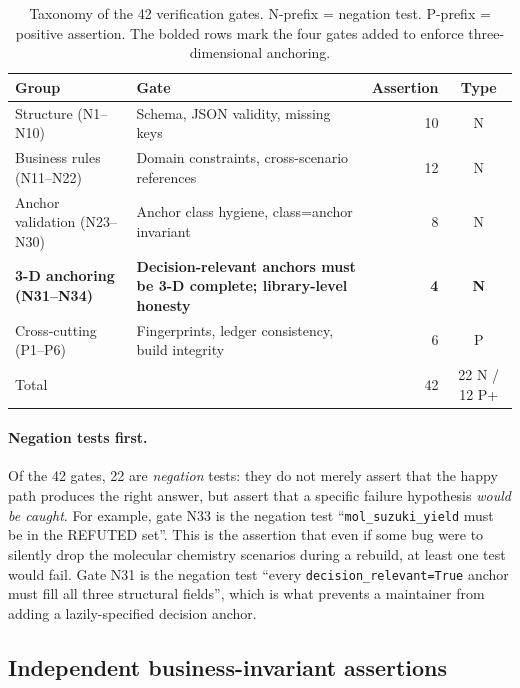 \documentclass[review,3p]{elsarticle}
\begin{document}
\begin{table}[h]
    \centering
    \caption{Taxonomy of the 42 verification gates. N-prefix = negation test. P-prefix = positive assertion. The bolded rows mark the four gates added to enforce three-dimensional anchoring.}
    \label{tab:gates}
    \begin{tabular}{l l r c}
        \toprule
        Group & Gate & Assertion & Type \\
        \midrule
        Structure (N1--N10) & Schema, JSON validity, missing keys & 10 & N \\
        Business rules (N11--N22) & Domain constraints, cross-scenario references & 12 & N \\
        Anchor validation (N23--N30) & Anchor class hygiene, class=anchor invariant & 8 & N \\
        \textbf{3-D anchoring (N31--N34)} & \textbf{Decision-relevant anchors must be 3-D complete; library-level honesty} & \textbf{4} & \textbf{N} \\
        Cross-cutting (P1--P6) & Fingerprints, ledger consistency, build integrity & 6 & P \\
        \midrule
        Total & & 42 & 22 N / 12 P+ \\
        \bottomrule
    \end{tabular}
\end{table}

\paragraph{Negation tests first.}
Of the 42 gates, 22 are \emph{negation} tests: they do not merely assert that the happy path produces the right answer, but assert that a specific failure hypothesis \emph{would be caught}. For example, gate N33 is the negation test ``\texttt{mol\_suzuki\_yield} must be in the REFUTED set''. This is the assertion that even if some bug were to silently drop the molecular chemistry scenarios during a rebuild, at least one test would fail. Gate N31 is the negation test ``every \texttt{decision\_relevant=True} anchor must fill all three structural fields'', which is what prevents a maintainer from adding a lazily-specified decision anchor.

\subsection{Independent business-invariant assertions}
\label{sec:invariants}
\end{document}
